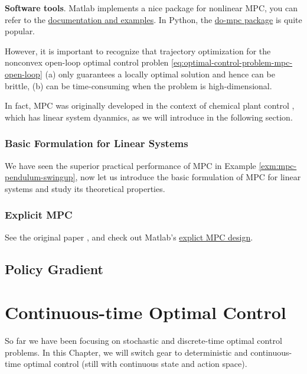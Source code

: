 \documentclass[
]{book}
\theoremstyle{definition}
\theoremstyle{definition}
\theoremstyle{definition}
\theoremstyle{definition}
\theoremstyle{remark}
\begin{document}
\textbf{Software tools}. Matlab implements a nice package for nonlinear MPC, you can refer to the \href{https://www.mathworks.com/help/mpc/ug/nonlinear-mpc.html}{documentation and examples}. In Python, the \href{https://www.do-mpc.com/en/latest/}{do-mpc package} is quite popular.

However, it is important to recognize that trajectory optimization for the nonconvex open-loop optimal control problen \eqref{eq:optimal-control-problem-mpc-open-loop} (a) only guarantees a locally optimal solution and hence can be brittle, (b) can be time-consuming when the problem is high-dimensional.

In fact, MPC was originally developed in the context of chemical plant control \citep{borrelli17book-mpc}, which has linear system dyanmics, as we will introduce in the following section.

\hypertarget{basic-formulation-for-linear-systems}{%
\subsection{Basic Formulation for Linear Systems}\label{basic-formulation-for-linear-systems}}

We have seen the superior practical performance of MPC in Example \ref{exm:mpc-pendulum-swingup}, now let us introduce the basic formulation of MPC for linear systems and study its theoretical properties.

\hypertarget{explicit-mpc}{%
\subsection{Explicit MPC}\label{explicit-mpc}}

See the original paper \citep{bemporad02automatica-explicit}, and check out Matlab's \href{https://www.mathworks.com/help/mpc/explicit-mpc-design.html}{explict MPC design}.

\hypertarget{policy-gradient}{%
\section{Policy Gradient}\label{policy-gradient}}

\hypertarget{continuous-time-optimal-control}{%
\chapter{Continuous-time Optimal Control}\label{continuous-time-optimal-control}}

So far we have been focusing on stochastic and discrete-time optimal control problems. In this Chapter, we will switch gear to deterministic and continuous-time optimal control (still with continuous state and action space).
\end{document}
